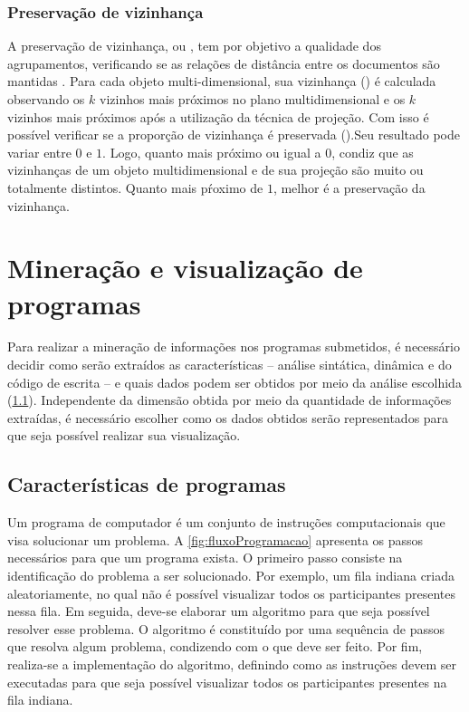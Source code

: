 			\subsubsection{Preservação de vizinhança}
			\label{subsubsec:vizinhanca}
			
				A preservação de vizinhança, ou 
				\cite{paulovich2008hipp}, tem por objetivo a qualidade dos agrupamentos,
				verificando se as relações de distância entre os documentos são mantidas
				\cite{phd:paulovich}. Para cada objeto multi-dimensional, sua vizinhança
				() é calculada observando os $k$ vizinhos mais
				próximos no plano multidimensional e os $k$ vizinhos mais próximos após a
				utilização da técnica de projeção. Com isso é possível verificar se a
				proporção de vizinhança é preservada ().Seu resultado
				pode variar entre $0$ e $1$. Logo, quanto mais próximo ou igual a
				$0$, condiz que as vizinhanças de um objeto multidimensional e de sua projeção
				são muito ou totalmente distintos. Quanto mais pŕoximo de $1$, melhor é a
				preservação da vizinhança.

	\section{Mineração e visualização de programas}
	\label{sec:MinVisual}
		Para realizar a mineração de informações nos programas submetidos, é necessário
		decidir como serão extraídos as características -- análise sintática, dinâmica e
		do código de escrita -- e quais dados podem ser obtidos por meio da análise
		escolhida (\cref{subSec:Caracteristicas}). Independente da dimensão
		obtida por meio da quantidade de informações extraídas, é necessário escolher
		como os dados obtidos serão representados para que seja possível realizar sua visualização.
		
		\subsection{Características de programas}
		\label{subSec:Caracteristicas}
			
			Um programa de computador é um conjunto de instruções computacionais que visa
			solucionar um problema. A \cref{fig:fluxoProgramacao} apresenta os passos
			necessários para que um programa exista. O primeiro passo consiste na
			identificação do problema a ser solucionado. Por exemplo, um fila indiana
			criada aleatoriamente, no qual não é possível visualizar todos os participantes
			presentes nessa fila. Em seguida, deve-se elaborar um algoritmo para que seja
			possível resolver esse problema. O algoritmo é constituído por uma sequência
			de passos que resolva algum problema, condizendo com o que deve ser feito.
			Por fim, realiza-se a implementação do algoritmo, definindo como as instruções
			devem ser executadas para que seja possível visualizar todos os participantes
			presentes na fila indiana.

